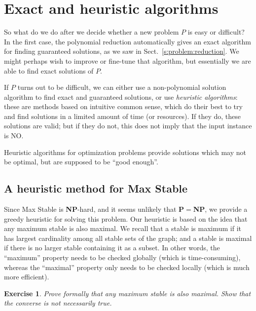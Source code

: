 \documentclass[a4paper]{book}
\theoremstyle{changebreak}                %
\newtheorem{ex}[result]{Exercise}
\begin{document}
\section{Exact and heuristic algorithms}
\label{s:problem:exactheur}
So what do we do after we decide whether a new problem $P$ is easy or
difficult? In the first case, the polynomial reduction automatically
gives an exact algorithm for finding guaranteed
solutions, as we saw in Sect.~\ref{s:problem:reduction}.  We might
perhaps wish to improve or fine-tune that algorithm, but essentially
we are able to find exact solutions of $P$.

If $P$ turns out to be difficult, we can either use a
non-polynomial solution algorithm to
find exact and guaranteed solutions, or use {\it heuristic
  algorithms}: these are
methods based on intuitive common sense, which do their best to try
and find solutions in a limited amount of time (or
resources). If they do,
these solutions are valid; but if they do not, this does not imply
that the input instance is NO. 

Heuristic algorithms for optimization
problems provide solutions which may not
be optimal, but are supposed to be ``good
enough''.

\subsection{A heuristic method for {\sc Max Stable}}
Since {\sc Max Stable} is {\bf
  NP}-hard, and it seems unlikely that
{\bf P}$=${\bf NP}, we provide a greedy
heuristic for solving this problem. Our
heuristic is based on the idea that any maximum
stable is also maximal. We
recall that a stable is maximum if it has largest
cardinality among all stable sets of the
graph; and a stable is maximal if there is no larger stable containing
it as a subset. In other words, the ``maximum'' property needs to be
checked globally (which is time-consuming), whereas the ``maximal''
property only needs to be checked locally (which is much more
efficient).

\begin{ex}
Prove formally that any maximum stable is also maximal. Show that the
converse is not necessarily true.
\end{ex}
\end{document}

